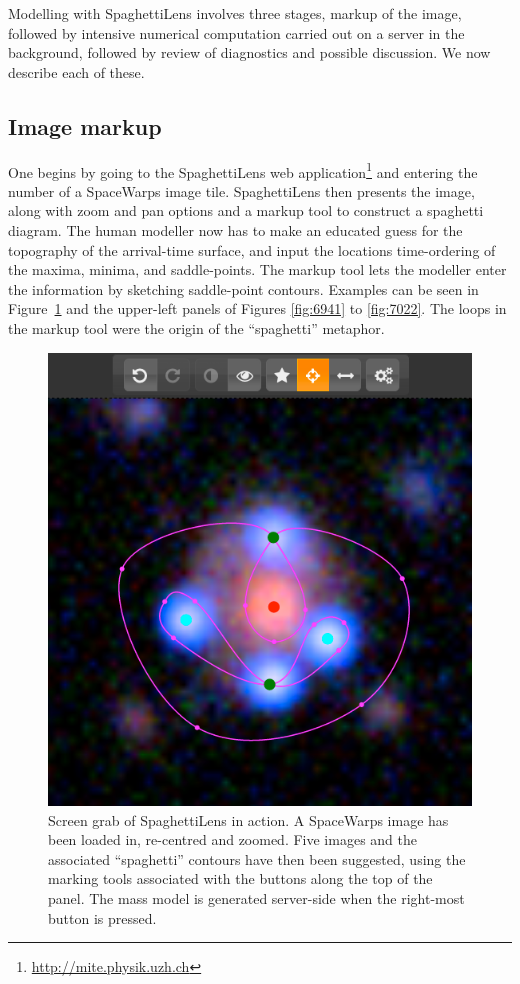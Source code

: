 \documentclass[usenatbib]{mn2e}
\newcommand{\spl}{SpaghettiLens\xspace}
\newcommand{\sw}{SpaceWarps\xspace}
\begin{document}
Modelling with \spl involves three stages, markup of the image,
followed by intensive numerical computation carried out on a
server in the background, followed by review
of diagnostics and possible discussion.  We now describe each of
these.



\subsection{Image markup}

One begins by going to the \spl web application\footnote{\url{
http://mite.physik.uzh.ch}} and entering the number of a
\sw image tile.  \spl then presents the image, along with zoom and pan
options and a markup tool to construct a spaghetti diagram.  The human
modeller now has to make an educated guess for the topography of the
arrival-time surface, and input the locations time-ordering of the
maxima, minima, and saddle-points.  The markup tool \citep[which is
inspired by Figure~6 of][and is like that figure made interactive and
overlaid on data]{1986ApJ...310..568B} lets the modeller enter the
information by sketching saddle-point contours.  Examples can be seen in Figure~\ref{fig:screenshot} and the upper-left
panels of Figures \ref{fig:6941} to \ref{fig:7022}.  The loops in the
markup tool were the origin of the ``spaghetti'' metaphor.

\begin{figure}
  \centering
    \includegraphics[width=0.90\linewidth]{fig/screenshot}
  \caption{Screen grab of \spl in action. A \sw image has been loaded
    in, re-centred and zoomed.  Five images and the associated
    ``spaghetti'' contours have then been suggested, using the marking
    tools associated with the buttons along the top of the panel. The
    mass model is generated server-side when the right-most button is
    pressed.}
  \label{fig:screenshot}
\end{figure}
\end{document}
